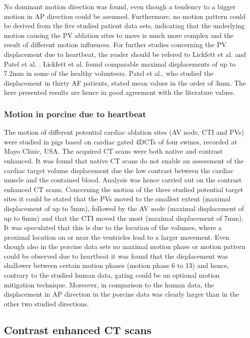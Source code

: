 No dominant motion direction was found, even though a tendency to a bigger motion in AP direction could be assumed. Furthermore, no motion 
pattern could be derived from the five studied patient data sets, indicating that the underlying motion causing the PV ablation sites to 
move is much more complex and the result of different motion influences. For further studies concerning the PV displacement due to 
heartbeat, the reader should be refered to Lickfett et al. \cite{Lic05} and Patel et al. \cite{Pat08}. 
Lickfett et al. found comparable maximal displacements of up to 7.2mm in some of the healthy volunteers. Patel et al., who studied 
the displacement in thirty AF patients, stated mean values in the order of 3mm. The here presented results are hence in good agreement 
with the literature values. 

\subsubsection{Motion in porcine due to heartbeat}

The motion of different potential cardiac ablation sites (AV node, CTI and PVs) were studied in pigs based on cardiac gated 4DCTs of four 
swines, recorded at Mayo Clinic, USA. The acquired CT scans were both native and contrast enhanced. It was found that native CT scans 
do not enable an assessment of the cardiac target volume displacement due the low contrast between the cardiac muscle and the contained blood. 
Analysis was hence carried out on the contrast enhanced CT scans. Concerning the motion of the three studied potential target sites 
it could be stated that the PVs moved to the smallest extent (maximal displacement of up to 5mm), followed by the AV node (maximal 
displacement of up to 6mm) and that the CTI moved the most (maximal displacement of 7mm). It was speculated that 
this is due to the location of the volumes, where a proximal location on or near the ventricles lead to a larger movement. 
Even though also in the porcine data sets no maximal motion phase or motion pattern could be observed due to heartbeat it was found that the displacement was 
shallower between certain motion phases (motion phase 6 to 13) and hence, contrary to the studied human data, gating could be an optional 
motion mitigation technique. Moreover, in comparison to the human data, the displacement in AP direction in the porcine data was clearly 
larger than in the other two studied directions. 


\subsection{Contrast enhanced CT scans}
\label{diss:ceCT}

